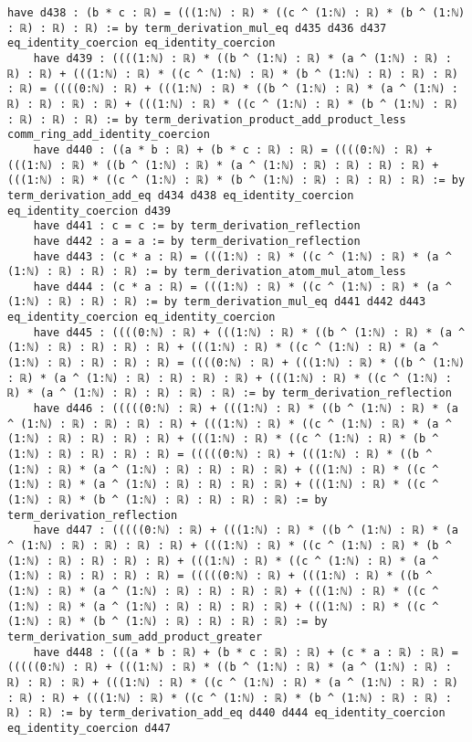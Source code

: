 \documentclass{article}
\begin{document}
\begin{tcolorbox}[colback=white!10, width=\linewidth]
\begin{lstlisting}[language=Lean4]
    have d438 : (b * c : ℝ) = (((1:ℕ) : ℝ) * ((c ^ (1:ℕ) : ℝ) * (b ^ (1:ℕ) : ℝ) : ℝ) : ℝ) := by term_derivation_mul_eq d435 d436 d437 eq_identity_coercion eq_identity_coercion
    have d439 : ((((1:ℕ) : ℝ) * ((b ^ (1:ℕ) : ℝ) * (a ^ (1:ℕ) : ℝ) : ℝ) : ℝ) + (((1:ℕ) : ℝ) * ((c ^ (1:ℕ) : ℝ) * (b ^ (1:ℕ) : ℝ) : ℝ) : ℝ) : ℝ) = ((((0:ℕ) : ℝ) + (((1:ℕ) : ℝ) * ((b ^ (1:ℕ) : ℝ) * (a ^ (1:ℕ) : ℝ) : ℝ) : ℝ) : ℝ) + (((1:ℕ) : ℝ) * ((c ^ (1:ℕ) : ℝ) * (b ^ (1:ℕ) : ℝ) : ℝ) : ℝ) : ℝ) := by term_derivation_product_add_product_less comm_ring_add_identity_coercion
    have d440 : ((a * b : ℝ) + (b * c : ℝ) : ℝ) = ((((0:ℕ) : ℝ) + (((1:ℕ) : ℝ) * ((b ^ (1:ℕ) : ℝ) * (a ^ (1:ℕ) : ℝ) : ℝ) : ℝ) : ℝ) + (((1:ℕ) : ℝ) * ((c ^ (1:ℕ) : ℝ) * (b ^ (1:ℕ) : ℝ) : ℝ) : ℝ) : ℝ) := by term_derivation_add_eq d434 d438 eq_identity_coercion eq_identity_coercion d439
    have d441 : c = c := by term_derivation_reflection
    have d442 : a = a := by term_derivation_reflection
    have d443 : (c * a : ℝ) = (((1:ℕ) : ℝ) * ((c ^ (1:ℕ) : ℝ) * (a ^ (1:ℕ) : ℝ) : ℝ) : ℝ) := by term_derivation_atom_mul_atom_less
    have d444 : (c * a : ℝ) = (((1:ℕ) : ℝ) * ((c ^ (1:ℕ) : ℝ) * (a ^ (1:ℕ) : ℝ) : ℝ) : ℝ) := by term_derivation_mul_eq d441 d442 d443 eq_identity_coercion eq_identity_coercion
    have d445 : ((((0:ℕ) : ℝ) + (((1:ℕ) : ℝ) * ((b ^ (1:ℕ) : ℝ) * (a ^ (1:ℕ) : ℝ) : ℝ) : ℝ) : ℝ) + (((1:ℕ) : ℝ) * ((c ^ (1:ℕ) : ℝ) * (a ^ (1:ℕ) : ℝ) : ℝ) : ℝ) : ℝ) = ((((0:ℕ) : ℝ) + (((1:ℕ) : ℝ) * ((b ^ (1:ℕ) : ℝ) * (a ^ (1:ℕ) : ℝ) : ℝ) : ℝ) : ℝ) + (((1:ℕ) : ℝ) * ((c ^ (1:ℕ) : ℝ) * (a ^ (1:ℕ) : ℝ) : ℝ) : ℝ) : ℝ) := by term_derivation_reflection
    have d446 : (((((0:ℕ) : ℝ) + (((1:ℕ) : ℝ) * ((b ^ (1:ℕ) : ℝ) * (a ^ (1:ℕ) : ℝ) : ℝ) : ℝ) : ℝ) + (((1:ℕ) : ℝ) * ((c ^ (1:ℕ) : ℝ) * (a ^ (1:ℕ) : ℝ) : ℝ) : ℝ) : ℝ) + (((1:ℕ) : ℝ) * ((c ^ (1:ℕ) : ℝ) * (b ^ (1:ℕ) : ℝ) : ℝ) : ℝ) : ℝ) = (((((0:ℕ) : ℝ) + (((1:ℕ) : ℝ) * ((b ^ (1:ℕ) : ℝ) * (a ^ (1:ℕ) : ℝ) : ℝ) : ℝ) : ℝ) + (((1:ℕ) : ℝ) * ((c ^ (1:ℕ) : ℝ) * (a ^ (1:ℕ) : ℝ) : ℝ) : ℝ) : ℝ) + (((1:ℕ) : ℝ) * ((c ^ (1:ℕ) : ℝ) * (b ^ (1:ℕ) : ℝ) : ℝ) : ℝ) : ℝ) := by term_derivation_reflection
    have d447 : (((((0:ℕ) : ℝ) + (((1:ℕ) : ℝ) * ((b ^ (1:ℕ) : ℝ) * (a ^ (1:ℕ) : ℝ) : ℝ) : ℝ) : ℝ) + (((1:ℕ) : ℝ) * ((c ^ (1:ℕ) : ℝ) * (b ^ (1:ℕ) : ℝ) : ℝ) : ℝ) : ℝ) + (((1:ℕ) : ℝ) * ((c ^ (1:ℕ) : ℝ) * (a ^ (1:ℕ) : ℝ) : ℝ) : ℝ) : ℝ) = (((((0:ℕ) : ℝ) + (((1:ℕ) : ℝ) * ((b ^ (1:ℕ) : ℝ) * (a ^ (1:ℕ) : ℝ) : ℝ) : ℝ) : ℝ) + (((1:ℕ) : ℝ) * ((c ^ (1:ℕ) : ℝ) * (a ^ (1:ℕ) : ℝ) : ℝ) : ℝ) : ℝ) + (((1:ℕ) : ℝ) * ((c ^ (1:ℕ) : ℝ) * (b ^ (1:ℕ) : ℝ) : ℝ) : ℝ) : ℝ) := by term_derivation_sum_add_product_greater
    have d448 : (((a * b : ℝ) + (b * c : ℝ) : ℝ) + (c * a : ℝ) : ℝ) = (((((0:ℕ) : ℝ) + (((1:ℕ) : ℝ) * ((b ^ (1:ℕ) : ℝ) * (a ^ (1:ℕ) : ℝ) : ℝ) : ℝ) : ℝ) + (((1:ℕ) : ℝ) * ((c ^ (1:ℕ) : ℝ) * (a ^ (1:ℕ) : ℝ) : ℝ) : ℝ) : ℝ) + (((1:ℕ) : ℝ) * ((c ^ (1:ℕ) : ℝ) * (b ^ (1:ℕ) : ℝ) : ℝ) : ℝ) : ℝ) := by term_derivation_add_eq d440 d444 eq_identity_coercion eq_identity_coercion d447

\end{lstlisting}
\end{tcolorbox}
\end{document}
